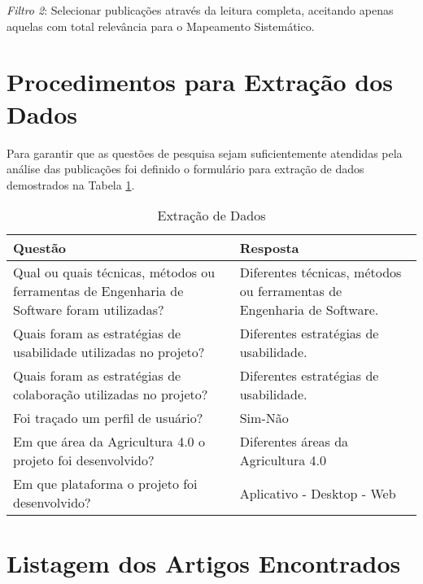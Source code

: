 \documentclass[12pt]{article}
\begin{document}
\noindent\textit{Filtro 2}: Selecionar publicações através da leitura completa, aceitando apenas aquelas com total relevância para o Mapeamento Sistemático. 

\section{Procedimentos para Extração dos Dados}

Para garantir que as questões de pesquisa sejam suficientemente atendidas pela análise das publicações foi definido o formulário para extração de dados demostrados na Tabela \ref{tab:extracao}.

\begin{table}[!htb]
	\footnotesize
  \centering
	\begin{tabular}{|p{8cm}|p{6cm}|}
		\hline
		\textbf{Questão}                                                                           & \textbf{Resposta}                                                      \\ \hline
		Qual ou quais técnicas, métodos ou ferramentas de Engenharia de Software foram utilizadas? & Diferentes técnicas, métodos ou ferramentas de Engenharia de Software. \\ \hline
		Quais foram as estratégias de usabilidade utilizadas no projeto?                           & Diferentes estratégias de usabilidade.                                 \\ \hline
		Quais foram as estratégias de colaboração utilizadas no projeto?                           & Diferentes estratégias de usabilidade.                                 \\ \hline
		Foi traçado um perfil de usuário?                                                          & Sim-Não                                                                \\ \hline
		Em que área da Agricultura 4.0 o projeto foi desenvolvido?                                 & Diferentes áreas da Agricultura 4.0                                    \\ \hline
		Em que plataforma o projeto foi desenvolvido?                                              & Aplicativo - Desktop - Web                                 \\ \hline
		\end{tabular}
  \caption{Extração de Dados}
  \label{tab:extracao}
\end{table}

\section{Listagem dos Artigos Encontrados}
\end{document}

